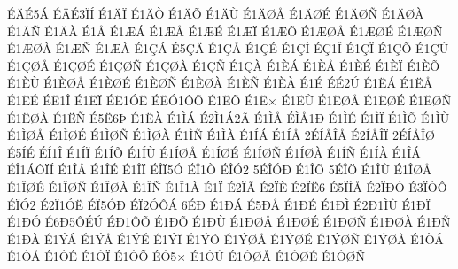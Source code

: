 {^^c9^^c4^^c95^^c1
^^c9^^c4^^c93^^cf^^cd
^^c91^^c4^^cf
^^c91^^c4^^d2
^^c91^^c4^^d5
^^c91^^c4^^d9
^^c91^^c4^^d8^^c5
^^c91^^c4^^d8^^c9
^^c91^^c4^^d8^^d1
^^c91^^c4^^d8^^c0
^^c91^^c4^^d1
^^c91^^c4^^c0
^^c91^^c5
^^c91^^c6^^c1
^^c91^^c6^^c5
^^c91^^c6^^c9
^^c91^^c6^^cf
^^c91^^c6^^d5
^^c91^^c6^^d8^^c5
^^c91^^c6^^d8^^c9
^^c91^^c6^^d8^^d1
^^c91^^c6^^d8^^c0
^^c91^^c6^^d1
^^c91^^c6^^c0
^^c91^^c7^^c1
^^c95^^c7^^c4
^^c91^^c7^^c5
^^c91^^c7^^c9
^^c91^^c7^^cc
^^c9^^c71^^ce
^^c91^^c7^^cf
^^c91^^c7^^d5
^^c91^^c7^^d9
^^c91^^c7^^d8^^c5
^^c91^^c7^^d8^^c9
^^c91^^c7^^d8^^d1
^^c91^^c7^^d8^^c0
^^c91^^c7^^d1
^^c91^^c7^^c0
^^c91^^c8^^c1
^^c91^^c8^^c5
^^c91^^c8^^c9
^^c91^^c8^^cf
^^c91^^c8^^d5
^^c91^^c8^^d9
^^c91^^c8^^d8^^c5
^^c91^^c8^^d8^^c9
^^c91^^c8^^d8^^d1
^^c91^^c8^^d8^^c0
^^c91^^c8^^d1
^^c91^^c8^^c0
^^c91^^c9
^^c9^^c92^^da
^^c91^^cb^^c1
^^c91^^cb^^c5
^^c91^^cb^^c9
^^c9^^cb1^^ce
^^c91^^cb^^cf
^^c9^^cb1^^d3^^cb
^^c9^^cb^^d31^^d4^^d5
^^c91^^cb^^d5
^^c91^^cb^^d7
^^c91^^cb^^d9
^^c91^^cb^^d8^^c5
^^c91^^cb^^d8^^c9
^^c91^^cb^^d8^^d1
^^c91^^cb^^d8^^c0
^^c91^^cb^^d1
^^c95^^cb6^^de
^^c91^^cb^^c0
^^c91^^cc^^c1
^^c92^^cc1^^c12^^c3
^^c91^^cc^^c5
^^c9^^cc^^c51^^d0
^^c91^^cc^^c9
^^c91^^cc^^cf
^^c91^^cc^^d5
^^c91^^cc^^d9
^^c91^^cc^^d8^^c5
^^c91^^cc^^d8^^c9
^^c91^^cc^^d8^^d1
^^c91^^cc^^d8^^c0
^^c91^^cc^^d1
^^c91^^cc^^c0
^^c91^^cd^^c1
^^c91^^cd^^c5
2^^c9^^cd^^c5^^ce^^c5
^^c92^^cd^^c5^^ce^^cf
2^^c9^^cd^^c5^^ce^^d8
^^c95^^cd^^c9
^^c9^^cd1^^ce
^^c91^^cd^^cf
^^c91^^cd^^d5
^^c91^^cd^^d9
^^c91^^cd^^d8^^c5
^^c91^^cd^^d8^^c9
^^c91^^cd^^d8^^d1
^^c91^^cd^^d8^^c0
^^c91^^cd^^d1
^^c91^^cd^^c0
^^c91^^ce^^c1
^^c9^^ce1^^c1^^d4^^cf^^cd
^^c91^^ce^^c5
^^c91^^ce^^c9
^^c91^^ce^^cf
^^c9^^ce^^cf5^^d3
^^c9^^ce1^^d2
^^c9^^ce^^d32
5^^c9^^ce^^d3^^d0
^^c91^^ce^^d5
5^^c9^^ce^^d6
^^c91^^ce^^d9
^^c91^^ce^^d8^^c5
^^c91^^ce^^d8^^c9
^^c91^^ce^^d8^^d1
^^c91^^ce^^d8^^c0
^^c91^^ce^^d1
^^c91^^ce1^^c0
^^c91^^cf
^^c92^^cf^^c3
^^c92^^cf^^c8
^^c92^^cf^^cb6
^^c95^^cf^^cc^^c5
^^c92^^cf^^d0^^d2
^^c93^^cf^^d2^^d4
^^c9^^cf^^d32
^^c92^^cf1^^d3^^cb
^^c9^^cf5^^d3^^d0
^^c9^^cf2^^d3^^d4^^c1
6^^c9^^d0
^^c91^^d0^^c1
^^c95^^d0^^c5
^^c91^^d0^^c9
^^c91^^d0^^cc
^^c92^^d01^^cc^^d9
^^c91^^d0^^cf
^^c91^^d0^^d3
^^c96^^d05^^d4^^c9^^da
^^c9^^d01^^d4^^d5
^^c91^^d0^^d5
^^c91^^d0^^d9
^^c91^^d0^^d8^^c5
^^c91^^d0^^d8^^c9
^^c91^^d0^^d8^^d1
^^c91^^d0^^d8^^c0
^^c91^^d0^^d1
^^c91^^d0^^c0
^^c91^^dd^^c1
^^c91^^dd^^c5
^^c91^^dd^^c9
^^c91^^dd^^cf
^^c91^^dd^^d5
^^c91^^dd^^d8^^c5
^^c91^^dd^^d8^^c9
^^c91^^dd^^d8^^d1
^^c91^^dd^^d8^^c0
^^c91^^d2^^c1
^^c91^^d2^^c5
^^c91^^d2^^c9
^^c91^^d2^^cf
^^c91^^d2^^d5
^^c9^^d25^^d7
^^c91^^d2^^d9
^^c91^^d2^^d8^^c5
^^c91^^d2^^d8^^c9
^^c91^^d2^^d8^^d1
}
